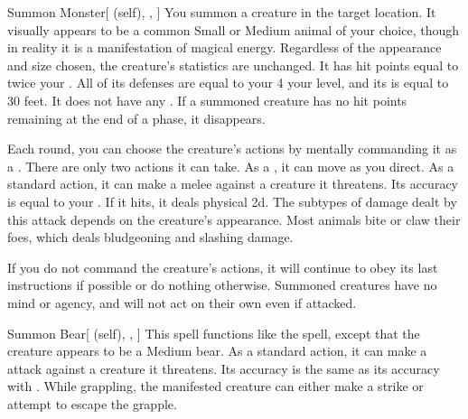 \lowercase{\hypertarget{spell:Summon Monster}{}}\label{spell:Summon Monster}
\begin{attuneability}[\nth{1}]{\hypertarget{spell:Summon Monster}{Summon Monster}}[ (self), , ]
You summon a creature in the target location.
It visually appears to be a common Small or Medium animal of your choice, though in reality it is a manifestation of magical energy.
Regardless of the appearance and size chosen, the creature's statistics are unchanged.
It has hit points equal to twice your .
All of its defenses are equal to your 4 \add your level, and its  is equal to 30 feet.
It does not have any .
If a summoned creature has no hit points remaining at the end of a phase, it disappears.

Each round, you can choose the creature's actions by mentally commanding it as a .
There are only two actions it can take.
As a , it can move as you direct.
As a standard action, it can make a melee  against a creature it threatens.
Its accuracy is equal to your .
If it hits, it deals physical  \minus2d.
The subtypes of damage dealt by this attack depends on the creature's appearance.
Most animals bite or claw their foes, which deals bludgeoning and slashing damage.

If you do not command the creature's actions, it will continue to obey its last instructions if possible or do nothing otherwise.
Summoned creatures have no mind or agency, and will not act on their own even if attacked.
\end{attuneability}
\vspace{0.25em}



\lowercase{\hypertarget{spell:Summon Bear}{}}\label{spell:Summon Bear}
\begin{attuneability}[\nth{2}]{\hypertarget{spell:Summon Bear}{Summon Bear}}[ (self), , ]
This spell functions like the  spell, except that the creature appears to be a Medium bear.
As a standard action, it can make a  attack against a creature it threatens.
Its accuracy is the same as its accuracy with .
While grappling, the manifested creature can either make a strike or attempt to escape the grapple.
\end{attuneability}
\vspace{0.25em}



